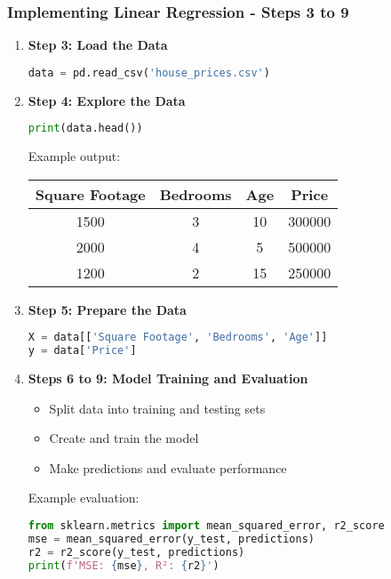 \documentclass[aspectratio=169]{beamer}
\begin{document}
\begin{frame}[fragile]
    \frametitle{Implementing Linear Regression - Steps 3 to 9}
    \begin{enumerate}
        \item \textbf{Step 3: Load the Data}
        \begin{lstlisting}[language=Python]
data = pd.read_csv('house_prices.csv')
        \end{lstlisting}
        
        \item \textbf{Step 4: Explore the Data}
        \begin{lstlisting}[language=Python]
print(data.head())
        \end{lstlisting}
        Example output:
        \begin{center}
            \begin{tabular}{|c|c|c|c|}
                \hline
                Square Footage & Bedrooms & Age & Price \\
                \hline
                1500 & 3 & 10 & 300000 \\
                2000 & 4 & 5 & 500000 \\
                1200 & 2 & 15 & 250000 \\
                \hline
            \end{tabular}
        \end{center}
        
        \item \textbf{Step 5: Prepare the Data}
        \begin{lstlisting}[language=Python]
X = data[['Square Footage', 'Bedrooms', 'Age']]
y = data['Price']
        \end{lstlisting}

        \item \textbf{Steps 6 to 9: Model Training and Evaluation}
        \begin{itemize}
            \item Split data into training and testing sets
            \item Create and train the model
            \item Make predictions and evaluate performance
        \end{itemize}
        
        Example evaluation:
        \begin{lstlisting}[language=Python]
from sklearn.metrics import mean_squared_error, r2_score
mse = mean_squared_error(y_test, predictions)
r2 = r2_score(y_test, predictions)
print(f'MSE: {mse}, R²: {r2}')
        \end{lstlisting}
    \end{enumerate}
\end{frame}
\end{document}
